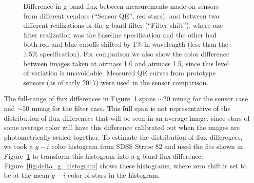 \documentclass[DM,toc]{lsstdoc}
\begin{document}
\begin{figure}
\caption{Difference in g-band flux between measurements made on sensors from
different vendors (``Sensor QE'', red stars), and between two different
realizations of the g-band filter (``Filter shift''), where one filter
realization was the baseline specification and the other had both red and blue
cutoffs shifted by 1\% in wavelength (less than the 1.5\% specification). For
comparison we also show the color difference between images taken at airmass 1.0
and airmass 1.5, since this level of variation is unavoidable. Measured QE
curves from prototype sensors (as of early 2017) were used in the sensor
comparison.
\label{fig:delta_g_vs_color}}
\end{figure}

The full-range of flux differences in Figure~\ref{fig:delta_g_vs_color} spans
$\sim 20$ mmag for the sensor case and $\sim 50$ mmag for the filter case. This
full span is not representative of the distribution of flux differences that
will be seen in an average image, since stars of some average color will have
this difference calibrated out when the images are photometrically scaled
together. To estimate the distribution of flux differences, we took a $g-i$
color histogram from SDSS Stripe 82 and used the fits shown in
Figure~\ref{fig:delta_g_vs_color} to transform this histogram into a g-band flux
difference. Figure~\ref{fig:delta_g_histogram} shows these histograms, where zero
shift is set to be at the mean $g-i$ color of stars in the histogram.
\end{document}
